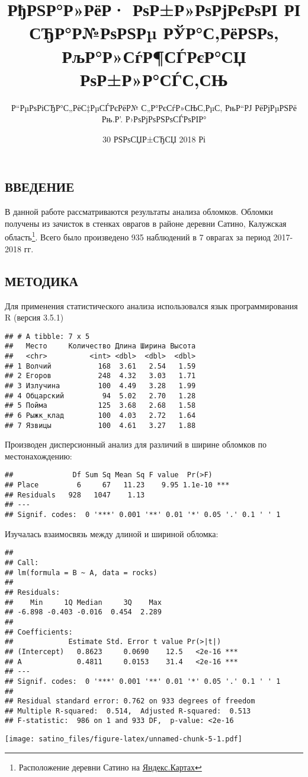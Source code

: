 \documentclass[]{article}
\title{РђРЅР°Р»РёР· РѕР±Р»РѕРјРєРѕРІ РІ СЂР°Р№РѕРЅРµ РЎР°С‚РёРЅРѕ,
РљР°Р»СѓР¶СЃРєР°СЏ РѕР±Р»Р°СЃС‚СЊ}
\author{Р``РµРѕРіСЂР°С„РёС‡РµСЃРєРёР№ С„Р°РєСѓР»СЊС‚РµС‚ РњР``РЈ РёРјРµРЅРё
Рњ.Р'. Р›РѕРјРѕРЅРѕСЃРѕРІР°}
\date{30 РЅРѕСЏР±СЂСЏ 2018 Рі}
\let\rmarkdownfootnote\footnote%
\def\footnote{\protect\rmarkdownfootnote}
\begin{document}
\maketitle

\subsection{ВВЕДЕНИЕ}

В данной работе рассматриваются результаты анализа обломков. Обломки
получены из зачисток в стенках оврагов в районе деревни Сатино,
Калужская область\footnote{Расположение деревни Сатино на
  \href{https://yandex.ru/maps/?clid=1985551-225\&ll=36.380161\%2C55.206673\&z=15}{Яндекс.Картах}}.
Всего было произведено 935 наблюдений в 7 оврагах за период 2017-2018
гг.

\subsection{МЕТОДИКА}

Для применения статистического анализа использовался язык
программирования R (версия 3.5.1)

\begin{verbatim}
## # A tibble: 7 x 5
##   Место     Количество Длина Ширина Высота
##   <chr>          <int> <dbl>  <dbl>  <dbl>
## 1 Волчий           168  3.61   2.54   1.59
## 2 Егоров           248  4.32   3.03   1.71
## 3 Излучина         100  4.49   3.28   1.99
## 4 Обцарский         94  5.02   2.70   1.28
## 5 Пойма            125  3.68   2.68   1.58
## 6 Рыжк_клад        100  4.03   2.72   1.64
## 7 Язвицы           100  4.61   3.27   1.88
\end{verbatim}

Производен дисперсионный анализ для различий в ширине обломков по
местонахождению:

\begin{verbatim}
##              Df Sum Sq Mean Sq F value  Pr(>F)    
## Place         6     67   11.23    9.95 1.1e-10 ***
## Residuals   928   1047    1.13                    
## ---
## Signif. codes:  0 '***' 0.001 '**' 0.01 '*' 0.05 '.' 0.1 ' ' 1
\end{verbatim}

Изучалась взаимосвязь между длиной и шириной обломка:

\begin{verbatim}
## 
## Call:
## lm(formula = B ~ A, data = rocks)
## 
## Residuals:
##    Min     1Q Median     3Q    Max 
## -6.898 -0.403 -0.016  0.454  2.289 
## 
## Coefficients:
##             Estimate Std. Error t value Pr(>|t|)    
## (Intercept)   0.8623     0.0690    12.5   <2e-16 ***
## A             0.4811     0.0153    31.4   <2e-16 ***
## ---
## Signif. codes:  0 '***' 0.001 '**' 0.01 '*' 0.05 '.' 0.1 ' ' 1
## 
## Residual standard error: 0.762 on 933 degrees of freedom
## Multiple R-squared:  0.514,  Adjusted R-squared:  0.513 
## F-statistic:  986 on 1 and 933 DF,  p-value: <2e-16
\end{verbatim}

\texttt{[image: satino\_files/figure-latex/unnamed-chunk-5-1.pdf]}
\end{document}
